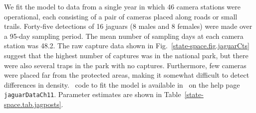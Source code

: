 We fit the model to data from a single year in which 46
camera stations were operational, each consisting of a pair of cameras placed along
roads or small trails. Forty-five detections of 16 jaguars (8 males and 8
females) were made over a 95-day sampling period. The mean number of
sampling days at each camera station was 48.2. The raw capture data
shown in Fig.~\ref{state-space.fig.jaguarCts} suggest that the highest
number of captures was in the national park, but there were also
several traps in the park with no captures. Furthermore, few cameras
were placed far from the protected areas, making it somewhat difficult
to detect differences in density. \R~code to fit the model is
available in \scrbook~on the help page \verb+jaguarDataCh11+.
Parameter estimates are shown in Table~\ref{state-space.tab.jagposts}.




